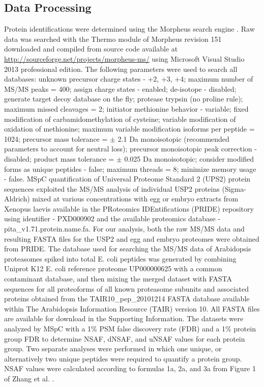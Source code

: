 \subsection{Data Processing}

Protein identifications were determined using the Morpheus search engine \citep{wenger13}.  Raw data was searched with the Thermo module of Morpheus revision 151 downloaded and compiled from source code available at \url{http://sourceforge.net/projects/morpheus-ms/} using Microsoft Visual Studio 2013 professional edition.  The following parameters were used to search all databases: unknown precursor charge states - +2, +3, +4; maximum number of MS/MS peaks = 400; assign charge states - enabled; de-isotope - disabled; generate target decoy database on the fly; protease trypsin (no proline rule); maximum missed cleavages = 2; initiator methionine behavior - variable; fixed modification of carbamidomethylation of cysteine; variable modification of oxidation of methionine; maximum variable modification isoforms per peptide = 1024; precursor mass tolerance = $\pm$ 2.1 Da monoisotopic (recommended parameters to account for neutral loss); precursor monoisotopic peak correction - disabled; product mass tolerance = $\pm$ 0.025 Da monoisotopic; consider modified forms as unique peptides - false; maximum threads = 8; minimize memory usage - false.   
MSpC quantification of Universal Proteome Standard 2 (UPS2) protein sequences exploited the MS/MS analysis of individual USP2 proteins (Sigma-Aldrich) mixed at various concentrations with egg or embryo extracts from Xenopus laevis available in the PRoteomics IDEntifications (PRIDE) repository \citep{vizcaino13} using identifier - PXD000902 and the available proteomics database - pita\_v1.71.protein.name.fa.  For our analysis, both the raw MS/MS data and resulting FASTA files for the USP2 and egg and embryo proteomes were obtained from PRIDE.  The database used for searching the MS/MS data of Arabidopsis proteasomes spiked into total E. coli peptides was generated by combining Uniprot K12 E. coli reference proteome UP000000625 with a common contaminant database, and then mixing the merged dataset with FASTA sequences for all proteoforms of all known proteasome subunits and associated proteins \citep{book10} obtained from the TAIR10\_pep\_20101214 FASTA database available within The Arabidopsis Information Resource (TAIR) version 10.  All FASTA files are available for download in the Supporting Information.  The datasets were analyzed by MSpC with a 1\% PSM false discovery rate (FDR) and a 1\% protein group FDR to determine NSAF, dNSAF, and uNSAF values for each protein group. Two separate analyses were performed in which one unique, or alternatively two unique peptides were required to quantify a protein group.  NSAF values were calculated according to formulas 1a, 2a, and 3a from Figure 1 of Zhang et al. \citep{zhang10}.
